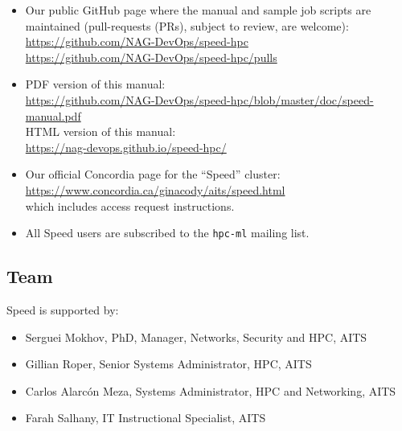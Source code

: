 \documentclass{easychair}
\begin{document}
\begin{itemize}
\item
Our public GitHub page where the manual and sample job scripts
are maintained (pull-requests (PRs), subject to review, are welcome):\\
\url{https://github.com/NAG-DevOps/speed-hpc}\\
\url{https://github.com/NAG-DevOps/speed-hpc/pulls}

\item
PDF version of this manual:\\
\url{https://github.com/NAG-DevOps/speed-hpc/blob/master/doc/speed-manual.pdf}\\
HTML version of this manual:\\
\url{https://nag-devops.github.io/speed-hpc/}

\item
Our official Concordia page for the ``Speed'' cluster:\\
\url{https://www.concordia.ca/ginacody/aits/speed.html}\\
which includes access request instructions.

\item
All Speed users are subscribed to the \texttt{hpc-ml} mailing
list.

\nocite{speed-intro-preso}

\end{itemize}

\subsection{Team}
\label{sect:speed-team}

Speed is supported by:

\begin{itemize}
	\item 
Serguei Mokhov, PhD, Manager, Networks, Security and HPC, AITS
	\item 
Gillian Roper, Senior Systems Administrator, HPC, AITS
	\item 
Carlos Alarcón Meza, Systems Administrator, HPC and Networking, AITS
	\item 
Farah Salhany, IT Instructional Specialist, AITS
\end{itemize}
\end{document}
